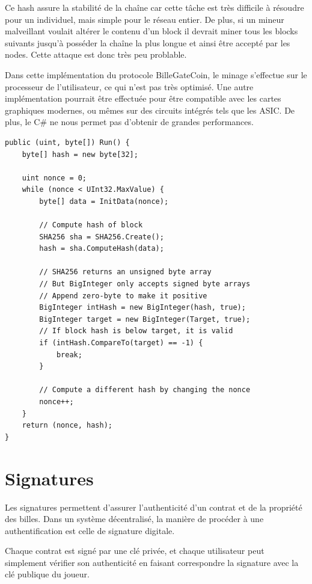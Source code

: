 \documentclass{article}
\begin{document}
Ce hash assure la stabilité de la chaîne car cette tâche est très difficile à résoudre pour un individuel, mais simple pour le réseau entier. De plus, si un mineur malveillant voulait altérer le contenu d'un block il devrait miner tous les blocks suivants jusqu'à posséder la chaîne la plus longue et ainsi être accepté par les nodes. Cette attaque est donc très peu problable.

Dans cette implémentation du protocole BilleGateCoin, le minage s'effectue sur le processeur de l'utilisateur, ce qui n'est pas très optimisé. Une autre implémentation pourrait être effectuée pour être compatible avec les cartes graphiques modernes, ou mêmes sur des circuits intégrés tels que les ASIC. De plus, le C\# ne nous permet pas d'obtenir de grandes performances. \\
\filbreak
\begin{verbatim}
public (uint, byte[]) Run() {
    byte[] hash = new byte[32];

    uint nonce = 0;
    while (nonce < UInt32.MaxValue) {
        byte[] data = InitData(nonce);
        
        // Compute hash of block
        SHA256 sha = SHA256.Create();
        hash = sha.ComputeHash(data);
        
        // SHA256 returns an unsigned byte array
        // But BigInteger only accepts signed byte arrays
        // Append zero-byte to make it positive
        BigInteger intHash = new BigInteger(hash, true);
        BigInteger target = new BigInteger(Target, true);
        // If block hash is below target, it is valid
        if (intHash.CompareTo(target) == -1) {
            break;
        }

        // Compute a different hash by changing the nonce
        nonce++;
    }
    return (nonce, hash);
}
\end{verbatim}


\section{Signatures}
Les signatures permettent d'assurer l'authenticité d'un contrat et de la propriété des billes. Dans un système décentralisé, la manière de procéder à une authentification est celle de signature digitale.

Chaque contrat est signé par une clé privée, et chaque utilisateur peut simplement vérifier son authenticité en faisant correspondre la signature avec la clé publique du joueur.
\end{document}
